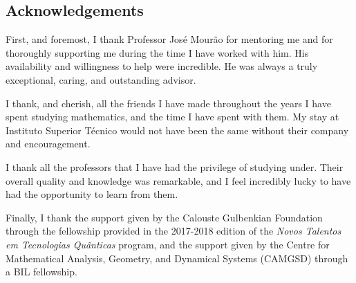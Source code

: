 \documentclass[notas.tex]{subfiles} 				%
\begin{document}
\subsection*{Acknowledgements}

First, and foremost, I thank Professor José Mourão for mentoring me and for thoroughly supporting me during the time I have worked with him. His availability and willingness to help were incredible. He was always a truly exceptional, caring, and outstanding advisor.

I thank, and cherish, all the friends I have made throughout the years I have spent studying mathematics, and the time I have spent with them. My stay at Instituto Superior Técnico would not have been the same without their company and encouragement.

I thank all the professors that I have had the privilege of studying under. Their overall quality and knowledge was remarkable, and I feel incredibly lucky to have had the opportunity to learn from them.

Finally, I thank the support given by the Calouste Gulbenkian Foundation through the fellowship provided in the 2017-2018 edition of the \emph{Novos Talentos em Tecnologias Quânticas} program, and the support given by the Centre for Mathematical Analysis, Geometry, and Dynamical Systems (CAMGSD) through a BIL fellowship.
\end{document}
